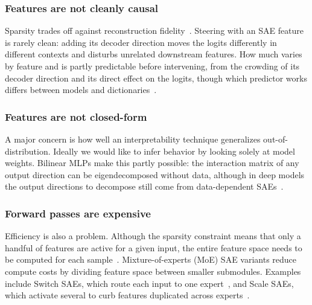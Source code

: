 \subsubsection{Features are not cleanly causal}
Sparsity trades off against reconstruction fidelity~\cite{gao2024}.
Steering with an SAE feature is rarely clean: adding its decoder
direction moves the logits differently in different contexts and
disturbs unrelated downstream features. How much varies by feature and is
partly predictable before intervening, from the crowding of its decoder
direction and its direct effect on the logits, though which predictor
works differs between models and dictionaries~\cite{duan2026}.

\subsubsection{Features are not closed-form}
A major concern is how well an interpretability technique generalizes
out-of-distribution. Ideally we would like to infer behavior by looking
solely at model weights. Bilinear MLPs make this partly possible: the
interaction matrix of any output direction can be eigendecomposed
without data, although in deep models the output directions to
decompose still come from data-dependent SAEs~\cite{pearce2025}.

\subsubsection{Forward passes are expensive}
Efficiency is also a problem. Although the sparsity constraint means
that only a handful of features are active for a given input, the
entire feature space needs to be computed for each
sample~\cite{gao2024,mudide2025}. Mixture-of-experts (MoE) SAE variants
reduce compute costs by dividing feature space between smaller
submodules. Examples include Switch SAEs, which route each input to one
expert~\cite{mudide2025}, and Scale SAEs, which activate several to curb
features duplicated across
experts~\cite{xu2025redundancydiversespecializedmultiexpert}.

